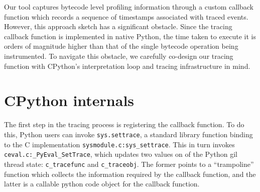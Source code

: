 Our tool captures bytecode level profiling information through a custom callback function which records a sequence of timestamps associated with traced events.
However, this approach sketch has a significant obstacle. Since the tracing callback function is implemented in native Python, the time taken to execute it is orders of magnitude higher than that of the single bytecode operation being instrumented.
To navigate this obstacle, we carefully co-design our tracing function with CPython's interpretation loop and tracing infrastructure in mind.

\section{CPython internals}
\label{sec:profiling-bytecode-cpython-internals}


The first step in the tracing process is registering the callback function.
To do this, Python users can invoke \texttt{sys.settrace}, a standard library function binding to the C implementation \texttt{sysmodule.c:sys\_settrace}. This in turn invokes \texttt{ceval.c:\_PyEval\_SetTrace}, which updates two values on of the Python \ac{gil} thread state: \texttt{c\_tracefunc} and \texttt{c\_traceobj}. The former points to a ``trampoline'' function which collects the information required by the callback function, and the latter is a callable python code object for the callback function.









